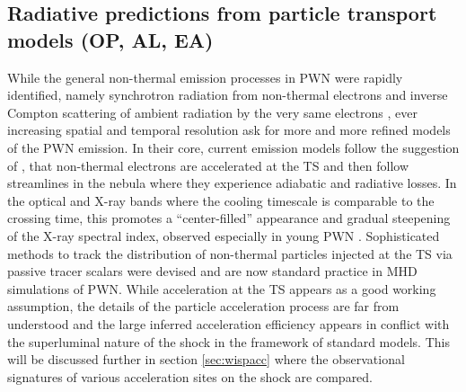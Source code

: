 \subsection{Radiative predictions from particle transport models      (OP, AL, EA)}
\label{sec:radiation}

While the general non-thermal emission processes in PWN were rapidly identified, namely synchrotron radiation from non-thermal electrons and inverse Compton scattering of ambient radiation by the very same electrons \citep{shklovsky:1953,dombrovsky1954nature,atoyan1996}, ever increasing spatial and temporal resolution ask for more and more refined models of the PWN emission.
In their core, current emission models follow the suggestion of \cite{kennel1984}, that non-thermal electrons are accelerated at the TS and then follow streamlines in the nebula where they experience adiabatic and radiative losses.  In the optical and X-ray bands where the cooling timescale is comparable to the crossing time, this promotes a ``center-filled'' appearance and gradual steepening of the X-ray spectral index, observed especially in young PWN \citep[e.g.][]{SlaneChen2000,SlaneHelfand2004}.  
Sophisticated methods to track the distribution of non-thermal particles injected at the TS via passive tracer scalars were devised \citep{del-zanna2006,camus2009} and are now standard practice in MHD simulations of PWN.
While acceleration at the TS appears as a good working assumption, the details of the particle acceleration process are far from understood and the large inferred acceleration efficiency appears in conflict with the superluminal nature of the shock in the framework of standard models.  
This will be discussed further in section \ref{sec:wispacc} where the observational signatures of various acceleration sites on the shock are compared.

